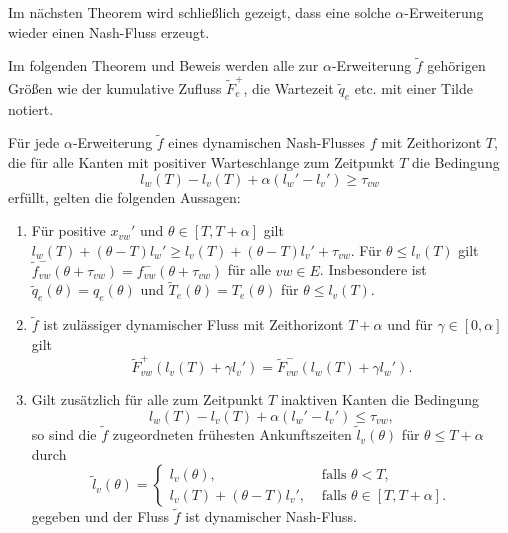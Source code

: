 Im nächsten Theorem wird schließlich gezeigt, dass eine solche $\alpha$-Erweiterung wieder einen Nash-Fluss erzeugt.

\begin{notation}
	Im folgenden Theorem und Beweis werden alle zur $\alpha$-Erweiterung $\tilde{f}$ gehörigen Größen wie der kumulative Zufluss $\tilde{F}_e^+$, die Wartezeit $\tilde{q}_e$ etc. mit einer Tilde notiert.
\end{notation}

\begin{theorem}\label{thm-alpha-extension-is-nash-flow}
	Für jede $\alpha$-Erweiterung $\tilde{f}$ eines dynamischen Nash-Flusses $f$ mit Zeithorizont $T$, die für alle Kanten mit positiver Warteschlange zum Zeitpunkt $T$ die Bedingung
	$$l_w(T) - l_v(T) + \alpha(l_w' - l_v') \geq \tau_{vw}$$
	erfüllt, gelten die folgenden Aussagen:
	\begin{enumerate}[label=(\roman*)]
		\item Für positive $x_{vw}'$ und $\theta\in[T, T+\alpha]$ gilt $l_w(T) + (\theta - T)l_w' \geq l_v(T) + (\theta - T)l_v' + \tau_{vw}$.
		Für $\theta \leq l_v(T)$ gilt $\tilde{f}^-_{vw}(\theta + \tau_{vw})=f^-_{vw}(\theta + \tau_{vw})$ für alle $vw\in E$.
		Insbesondere ist $\tilde{q}_e(\theta) = q_e(\theta)$ und $\tilde{T}_e(\theta) = T_e(\theta)$ für $\theta \leq l_v(T)$.
		\item $\tilde{f}$ ist zulässiger dynamischer Fluss mit Zeithorizont $T+\alpha$ und für $\gamma \in [0, \alpha]$ gilt
		$$\tilde{F}_{vw}^+(l_v(T) + \gamma l_v') = \tilde{F}_{vw}^-(l_w(T) + \gamma l_w').$$ 
		\item Gilt zusätzlich für alle zum Zeitpunkt $T$ inaktiven Kanten die Bedingung $$
		l_w(T) - l_v(T) + \alpha(l_w' -l_v') \leq \tau_{vw},
		$$
		so sind die $\tilde{f}$ zugeordneten frühesten Ankunftszeiten $\tilde{l}_v(\theta)$ für $\theta \leq T+\alpha$ durch
		$$\tilde{l}_v(\theta) = \begin{cases}
		l_v(\theta), & \text{ falls $\theta < T$,} \\
		l_v(T) + (\theta - T) l_v', & \text{ falls $\theta \in [T, T+\alpha]$.}
		\end{cases}$$
		gegeben und der Fluss $\tilde{f}$ ist dynamischer Nash-Fluss.
	\end{enumerate}
\end{theorem}

